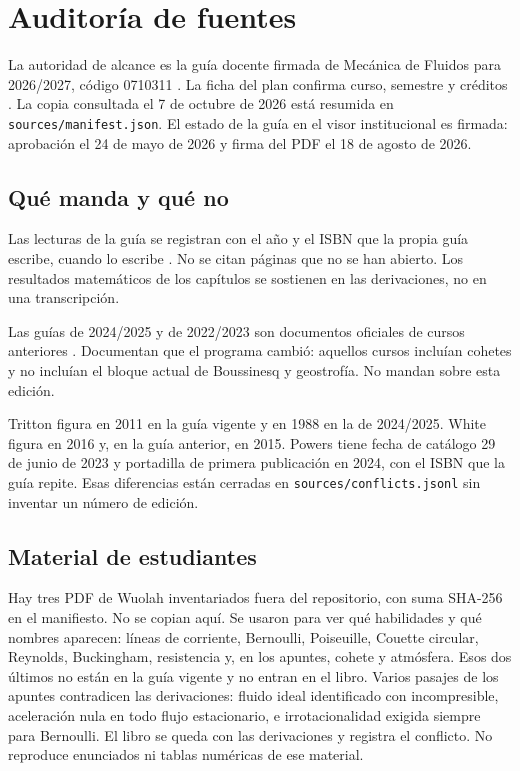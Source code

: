 \chapter{Auditoría de fuentes}
\label{ch:auditoria}

La autoridad de alcance es la guía docente firmada de Mecánica de Fluidos para 2026/2027, código 0710311 \parencite{uleGuia2026}. La ficha del plan confirma curso, semestre y créditos \parencite{ulePlan2026}. La copia consultada el 7 de octubre de 2026 está resumida en \texttt{sources/manifest.json}. El estado de la guía en el visor institucional es firmada: aprobación el 24 de mayo de 2026 y firma del PDF el 18 de agosto de 2026.

\section{Qué manda y qué no}

Las lecturas de la guía se registran con el año y el ISBN que la propia guía escribe, cuando lo escribe \parencite{taylor2005,shaughnessy2005,tritton2011,white2016,kundu2016,powers2024,boas2006,strogatz2018,anderson1995}. No se citan páginas que no se han abierto. Los resultados matemáticos de los capítulos se sostienen en las derivaciones, no en una transcripción.

Las guías de 2024/2025 y de 2022/2023 son documentos oficiales de cursos anteriores \parencite{uleGuia2024,uleGuia2022}. Documentan que el programa cambió: aquellos cursos incluían cohetes y no incluían el bloque actual de Boussinesq y geostrofía. No mandan sobre esta edición.

Tritton figura en 2011 en la guía vigente y en 1988 en la de 2024/2025. White figura en 2016 y, en la guía anterior, en 2015. Powers tiene fecha de catálogo 29 de junio de 2023 y portadilla de primera publicación en 2024, con el ISBN que la guía repite. Esas diferencias están cerradas en \texttt{sources/conflicts.jsonl} sin inventar un número de edición.

\section{Material de estudiantes}

Hay tres PDF de Wuolah inventariados fuera del repositorio, con suma SHA-256 en el manifiesto. No se copian aquí. Se usaron para ver qué habilidades y qué nombres aparecen: líneas de corriente, Bernoulli, Poiseuille, Couette circular, Reynolds, Buckingham, resistencia y, en los apuntes, cohete y atmósfera. Esos dos últimos no están en la guía vigente y no entran en el libro. Varios pasajes de los apuntes contradicen las derivaciones: fluido ideal identificado con incompresible, aceleración nula en todo flujo estacionario, e irrotacionalidad exigida siempre para Bernoulli. El libro se queda con las derivaciones y registra el conflicto. No reproduce enunciados ni tablas numéricas de ese material.

